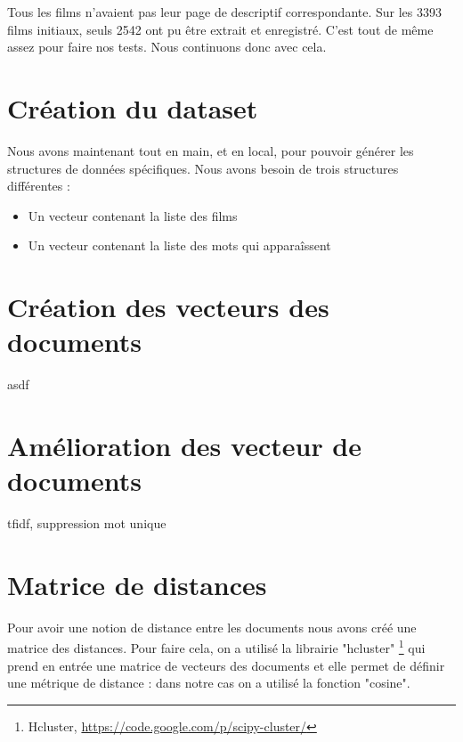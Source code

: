 Tous les films n'avaient pas leur page de descriptif correspondante. Sur les 3393 films initiaux, seuls 2542 ont pu être extrait et enregistré. C'est tout de même assez pour faire nos tests. Nous continuons donc avec cela.

\section{Création du dataset}

Nous avons maintenant tout en main, et en local, pour pouvoir générer les structures de données spécifiques. Nous avons besoin de trois structures différentes :

\begin{itemize}
 \item Un vecteur contenant la liste des films
 \item Un vecteur contenant la liste des mots qui apparaîssent
\end{itemize}




\section{Création des vecteurs des documents}

asdf


\section{Amélioration des vecteur de documents}

tfidf, suppression mot unique



\section{Matrice de distances}

\label{matrice-distance}
Pour avoir une notion de distance entre les documents nous avons créé une matrice des distances. Pour faire cela, on a utilisé la librairie "hcluster" \footnote{Hcluster, \url{https://code.google.com/p/scipy-cluster/}} qui prend en entrée une matrice de vecteurs des documents et elle permet de définir une métrique de distance : dans notre cas on a utilisé la fonction "cosine".

